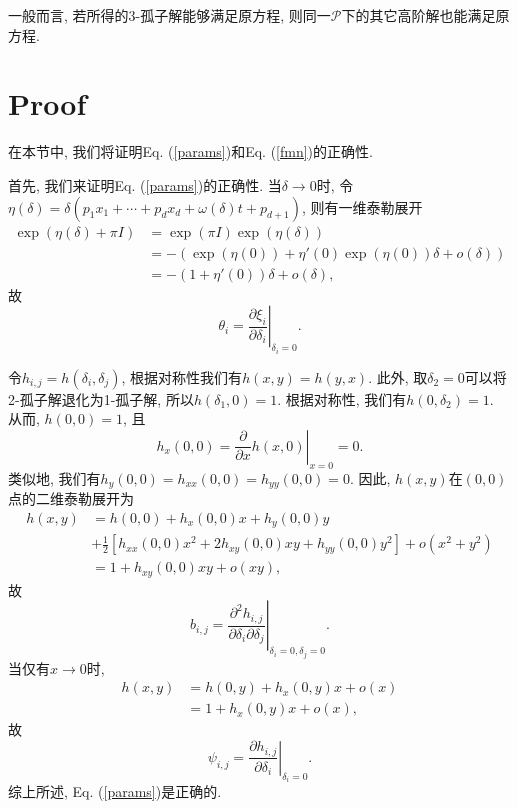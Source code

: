 \documentclass[12pt,a4paper,UTF8]{article}
\numberwithin{equation}{section}
\newcommand{\sbrace}[1]{\left(#1\right)}
\newcommand{\mbrace}[1]{\left[#1\right]}
\newcommand{\eval}[2]{\left.{#1}\right|_{#2}}
\newcommand{\PS}{\mathcal{P}}
\newcommand{\DIFF}[2]{\ensuremath{\frac{\partial #1}{\partial #2}}}
\newcommand{\refeqn}[1]{Eq. (\ref{#1})}
\begin{document}
一般而言, 若所得的3-孤子解能够满足原方程, 则同一$\PS$下的其它高阶解也能满足原方程. 

\section{Proof}\label{proof}
在本节中, 我们将证明\refeqn{params}和\refeqn{fmn}的正确性.

首先, 我们来证明\refeqn{params}的正确性. 当$\delta\to 0$时, 令$\eta(\delta)=\delta(p_1 x_1 +\cdots + p_d x_d + \omega(\delta)t+p_{d+1})$, 则有一维泰勒展开
\begin{equation}
\begin{aligned}
\exp(\eta(\delta)+\pi I)&=\exp(\pi I)\exp(\eta(\delta)) \\ 
&=-\sbrace{\exp(\eta(0))+\eta'(0)\exp(\eta(0))\delta+o(\delta)} \\ 
&=-(1+\eta'(0))\delta+o(\delta) , 
\end{aligned}
\end{equation}
故
\begin{equation}
  \theta_i = \eval{\DIFF{\xi_i}{\delta_i}}{\delta_i=0}.
\end{equation}

令$h_{i,j}=h(\delta_i,\delta_j)$, 根据对称性我们有$h(x,y)=h(y,x)$. 此外, 取$\delta_2=0$可以将2-孤子解退化为1-孤子解, 所以$h(\delta_1,0)=1$. 根据对称性, 我们有$h(0,\delta_2)=1$. 从而, $h(0,0)=1$, 且
\begin{equation}
    h_x(0,0)=\eval{\frac{\partial}{\partial x}h(x,0)}{x=0}=0.
\end{equation}
类似地, 我们有$h_y(0,0)=h_{xx}(0,0)=h_{yy}(0,0)=0$. 因此, $h(x,y)$在$(0,0)$点的二维泰勒展开为 
\begin{equation}
\begin{aligned}
h(x,y)&=h(0,0)+h_x(0,0)x+h_y(0,0)y \\ 
&+\frac{1}{2}\mbrace{h_{xx}(0,0)x^2+2h_{xy}(0,0)xy+h_{yy}(0,0)y^2}+o(x^2+y^2) \\ 
&=1+h_{xy}(0,0)xy+o(xy),
\end{aligned}
\end{equation}
故
\begin{equation}
  b_{i,j} = \eval{\frac{\partial^2 h_{i,j}}{\partial \delta_i \partial \delta_j}}{\delta_i=0,\delta_j=0}. 
\end{equation}
当仅有$x\to 0$时, 
\begin{equation}
\begin{aligned}
  h(x,y)&=h(0,y)+h_x(0,y)x+o(x) \\ 
  &=1+h_x(0,y)x+o(x),
\end{aligned}
\end{equation}
故
\begin{equation}
  \psi_{i,j} = \eval{\DIFF{h_{i,j}}{\delta_i}}{\delta_i=0}. 
\end{equation}
综上所述, \refeqn{params}是正确的. 
\end{document}
